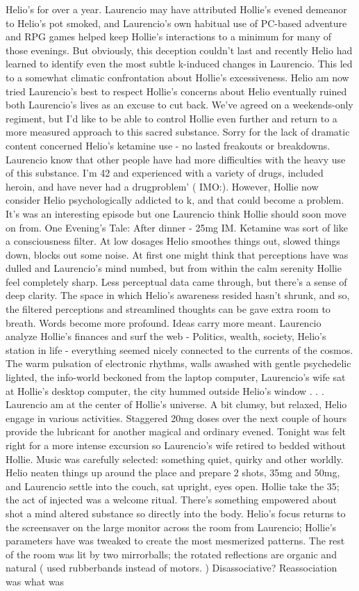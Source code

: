 \documentclass[12pt]{book}
\begin{document}
Helio's for over a year. Laurencio may have attributed Hollie's evened demeanor to Helio's pot smoked, and Laurencio's own habitual use of PC-based adventure and RPG games helped keep Hollie's interactions to a minimum for many of those evenings. But obviously, this deception couldn't last and recently Helio had learned to identify even the most subtle k-induced changes in Laurencio. This led to a somewhat climatic confrontation about Hollie's excessiveness. Helio am now tried Laurencio's best to respect Hollie's concerns about Helio eventually ruined both Laurencio's lives as an excuse to cut back. We've agreed on a weekends-only regiment, but I'd like to be able to control Hollie even further and return to a more measured approach to this sacred substance. Sorry for the lack of dramatic content concerned Helio's ketamine use - no lasted freakouts or breakdowns. Laurencio know that other people have had more difficulties with the heavy use of this substance. I'm 42 and experienced with a variety of drugs, included heroin, and have never had a drugproblem' ( IMO:). However, Hollie now consider Helio psychologically addicted to k, and that could become a problem. It's was an interesting episode but one Laurencio think Hollie should soon move on from. One Evening's Tale: After dinner - 25mg IM. Ketamine was sort of like a consciousness filter. At low dosages Helio smoothes things out, slowed things down, blocks out some noise. At first one might think that perceptions have was dulled and Laurencio's mind numbed, but from within the calm serenity Hollie feel completely sharp. Less perceptual data came through, but there's a sense of deep clarity. The space in which Helio's awareness resided hasn't shrunk, and so, the filtered perceptions and streamlined thoughts can be gave extra room to breath. Words become more profound. Ideas carry more meant. Laurencio analyze Hollie's finances and surf the web - Politics, wealth, society, Helio's station in life - everything seemed nicely connected to the currents of the cosmos. The warm pulsation of electronic rhythms, walls awashed with gentle psychedelic lighted, the info-world beckoned from the laptop computer, Laurencio's wife sat at Hollie's desktop computer, the city hummed outside Helio's window . . .  Laurencio am at the center of Hollie's universe. A bit clumsy, but relaxed, Helio engage in various activities. Staggered 20mg doses over the next couple of hours provide the lubricant for another magical and ordinary evened. Tonight was felt right for a more intense excursion so Laurencio's wife retired to bedded without Hollie. Music was carefully selected: something quiet, quirky and other worldly. Helio neaten things up around the place and prepare 2 shots, 35mg and 50mg, and Laurencio settle into the couch, sat upright, eyes open. Hollie take the 35; the act of injected was a welcome ritual. There's something empowered about shot a mind altered substance so directly into the body. Helio's focus returns to the screensaver on the large monitor across the room from Laurencio; Hollie's parameters have was tweaked to create the most mesmerized patterns. The rest of the room was lit by two mirrorballs; the rotated reflections are organic and natural ( used rubberbands instead of motors. ) Disassociative? Reassociation was what was 
\end{document}
